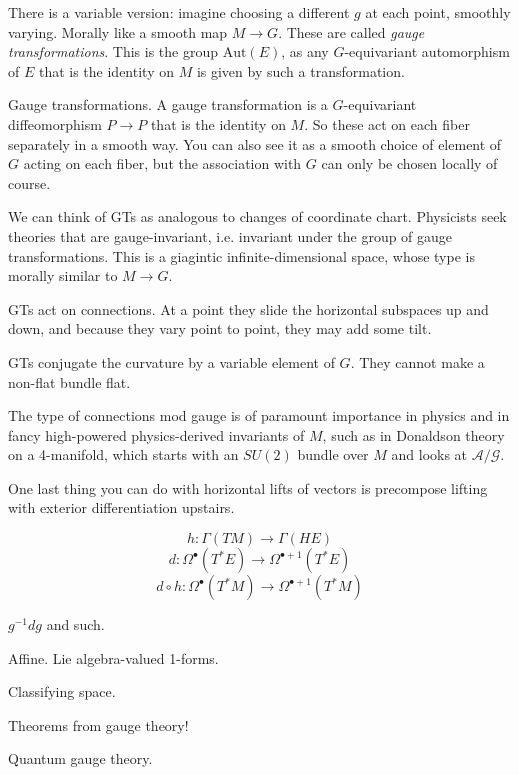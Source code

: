 \documentclass[12pt]{article}
\newcommand{\Aut}{\mathrm{Aut}}
\begin{document}
There is a variable version: imagine choosing a different $g$ at each point, smoothly varying. Morally like a smooth map $M\to G$. These are called \emph{gauge transformations}. This is the group $\Aut(E)$, as any $G$-equivariant automorphism of $E$ that is the identity on $M$ is given by such a transformation.

Gauge transformations. A gauge transformation is a $G$-equivariant diffeomorphism $P\to P$ that is the identity on $M$. So these act on each fiber separately in a smooth way. You can also see it as a smooth choice of element of $G$ acting on each fiber, but the association with $G$ can only be chosen locally of course.

We can think of GTs as analogous to changes of coordinate chart. Physicists seek theories that are gauge-invariant, i.e. invariant under the group of gauge transformations. This is a giagintic infinite-dimensional space, whose type is morally similar to $M\to G$.

GTs act on connections. At a point they slide the horizontal subspaces up and down, and because they vary point to point, they may add some tilt.

GTs conjugate the curvature by a variable element of $G$. They cannot make a non-flat bundle flat.

The type of connections mod gauge is of paramount importance in physics and in fancy high-powered physics-derived invariants of $M$, such as in Donaldson theory on a 4-manifold, which starts with an $SU(2)$ bundle over $M$ and looks at $\mathcal{A}/\mathcal{G}$.




One last thing you can do with horizontal lifts of vectors is precompose lifting with exterior differentiation upstairs.

$$h:\Gamma(TM)\to \Gamma(HE)$$
$$d:\Omega^\bullet(T^*E)\to \Omega^{\bullet+1}(T^*E)$$
$$d\circ h: \Omega^\bullet(T^*M)\to \Omega^{\bullet+1}(T^*M)$$

$g^{-1}dg$ and such.

Affine. Lie algebra-valued 1-forms.

Classifying space.

Theorems from gauge theory!

Quantum gauge theory.
\end{document}
